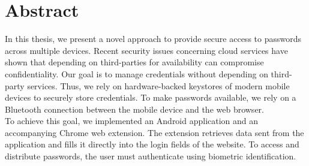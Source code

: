 
\section*{Abstract} \label{cha:abstract}
In this thesis, we present a novel approach to provide secure access to passwords across multiple devices. Recent security issues concerning cloud services have shown that depending on third-parties for availability can compromise confidentiality. Our goal is to manage credentials without depending on third-party services. Thus, we rely on hardware-backed keystores of modern mobile devices to securely store credentials. To make passwords available, we rely on a Bluetooth connection between the mobile device and the web browser. \\
To achieve this goal, we implemented an Android application and an accompanying Chrome web extension. The extension retrieves data sent from the application and fills it directly into the login fields of the website. To access and distribute passwords, the user must authenticate using biometric identification.

